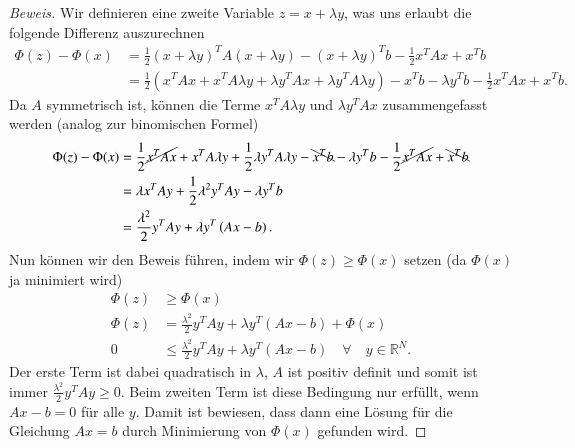 \begin{proof}[Beweis]
	Wir definieren eine zweite Variable $z = x + \lambda y$, was uns erlaubt die folgende Differenz auszurechnen
	\begin{align}
	\Phi(z) - \Phi(x) 
	&= 
	\frac{1}{2} \left(x + \lambda y\right) ^T A \left(x + \lambda y\right)  - \left(x + \lambda y\right) ^T b
	- 
	\frac{1}{2} x^T A x + x^T b 
	\\
	&= 
	\frac{1}{2} \left(x^T A x + x^T A \lambda y + \lambda y^T A x + \lambda y^T A \lambda y\right) 
	-
	x^T b - \lambda y^T b
	- 
	\frac{1}{2} x^T A x + x^T b .	
	\end{align}
	Da $A$ symmetrisch ist, können die Terme $x^T A \lambda y$ und $\lambda y^T A x$ zusammengefasst werden (analog zur binomischen Formel)
	\begin{align}
	\Phi(z) - \Phi(x) 
	&= 
	\frac{1}{2}\cancel{ x^T A x} + x^T A \lambda y + \frac{1}{2} \lambda y^T A \lambda y
	-
	\bcancel{x^T b} - \lambda y^T b
	- 
	\frac{1}{2}\cancel{ x^T A x} + \bcancel{x^T b} \\
	&=
	\lambda x^T A y	+ \frac{1}{2} {\lambda}^2 y^T A y - \lambda y^T b \\
	&=
	\frac{{\lambda}^2}{2} y^T A y + \lambda y^T \left(Ax -b \right) .
	\end{align}
	Nun können wir den Beweis führen, indem wir $\Phi(z) \ge \Phi(x)$ setzen (da $\Phi(x)$ ja minimiert wird)
	\begin{align}
	\Phi(z) &\ge \Phi(x) 
	\\
	\Phi(z) &= \frac{{\lambda}^2}{2} y^T A y + \lambda y^T \left(Ax -b \right) + \Phi(x) 
	\\
	0 &\le \frac{{\lambda}^2}{2} y^T A y + \lambda y^T \left(Ax - b \right) \quad \forall \quad y \in \mathbb{R}^N  .
	\end{align}
	Der erste Term ist dabei quadratisch in $\lambda$, $A$ ist positiv definit und somit ist immer $\frac{{\lambda}^2}{2} y^T A y \ge 0$.
	Beim zweiten Term ist diese Bedingung nur erfüllt, wenn $Ax - b = 0$ für alle $y$.
	Damit ist bewiesen, dass dann eine Lösung für die Gleichung $Ax = b$ durch Minimierung von $\Phi(x)$ gefunden wird.
\end{proof}


